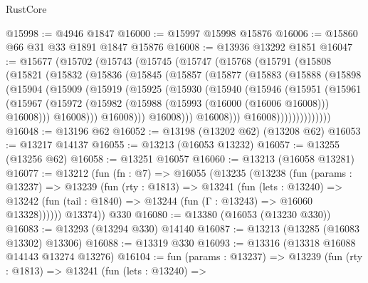\begin{lexlean}{RustCore}
\begin{coremodule}
@15998 := @4946 @1847
@16000 := @15997 @15998 @15876
@16006 := @15860 @66 @31 @33 @1891 @1847 @15876
@16008 := @13936 @13292 @1851
@16047 := @15677
    (@15702
      (@15743
        (@15745
          (@15747
            (@15768
              (@15791
                (@15808
                  (@15821
                    (@15832
                      (@15836
                        (@15845
                          (@15857
                            (@15877
                              (@15883
                                (@15888
                                  (@15898
                                    (@15904
                                      (@15909
                                        (@15919
                                          (@15925
                                            (@15930
                                              (@15940
                                                (@15946
                                                  (@15951
                                                    (@15961
                                                      (@15967
                                                        (@15972
                                                          (@15982
                                                            (@15988
                                                              (@15993 (@16000 (@16006 @16008)))
                                                              @16008)))
                                                        @16008)))
                                                  @16008)))
                                            @16008)))
                                      @16008)))
                                @16008))))))))))))))
@16048 := @13196 @62
@16052 := @13198 (@13202 @62) (@13208 @62)
@16053 := @13217 @14137
@16055 := @13213 (@16053 @13232)
@16057 := @13255 (@13256 @62)
@16058 := @13251 @16057
@16060 := @13213 (@16058 @13281)
@16077 := @13212
    (fun (fn : @7) =>
    @16055
      (@13235
        (@13238
          (fun (params : @13237) =>
          @13239
            (fun (rty : @1813) =>
            @13241
              (fun (lets : @13240) =>
              @13242 (fun (tail : @1840) => @13244 (fun (Γ : @13243) => @16060 @13328))))))
        @13374))
    @330
@16080 := @13380 (@16053 (@13230 @330))
@16083 := @13293 (@13294 @330) @14140
@16087 := @13213 (@13285 (@16083 @13302) @13306)
@16088 := @13319 @330
@16093 := @13316 (@13318 @16088 @14143 @13274 @13276)
@16104 := fun (params : @13237) =>
  @13239
    (fun (rty : @1813) =>
    @13241
      (fun (lets : @13240) =>

\end{coremodule}
\end{lexlean}
